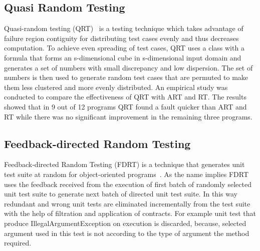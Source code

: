 \subsection{Quasi Random Testing}
Quasi-random testing (QRT)~\cite{chen2007quasi} is a testing technique which takes advantage of failure region contiguity for distributing test cases evenly and thus decreases computation. %
To achieve even spreading of test cases, QRT uses a class with a formula that forms an s-dimensional cube in s-dimensional input domain and generates a set of numbers with small discrepancy and low dispersion. The set of numbers is then used to generate random test cases that are permuted to make them less clustered and more evenly distributed. An empirical study was conducted to compare the effectiveness of QRT with ART and RT. The results showed that in 9 out of 12 programs QRT found a fault quicker than ART and RT while there was no significant improvement in the remaining three programs.


\subsection{Feedback-directed Random Testing}
Feedback-directed Random Testing (FDRT) is a technique that generates unit test suite at random for object-oriented programs~\cite{pacheco2007randoop}. As the name implies FDRT uses the feedback received from the execution of first batch of randomly selected unit test suite to generate next batch of directed unit test suite. In this way redundant  and wrong unit tests are eliminated incrementally from the test suite with the help of filtration and application of contracts. For example unit test that produce IllegalArgumentException on execution is discarded, because, selected argument used in this test is not according to the type of argument the method required. 

